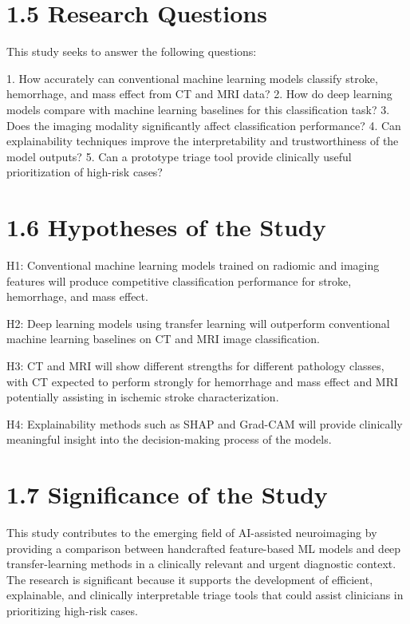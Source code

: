 \documentclass[12pt,a4paper]{report}
\begin{document}
\section{1.5 Research Questions}

This study seeks to answer the following questions:

1. How accurately can conventional machine learning models classify stroke, hemorrhage, and mass effect from CT and MRI data?
2. How do deep learning models compare with machine learning baselines for this classification task?
3. Does the imaging modality significantly affect classification performance?
4. Can explainability techniques improve the interpretability and trustworthiness of the model outputs?
5. Can a prototype triage tool provide clinically useful prioritization of high-risk cases?

\section{1.6 Hypotheses of the Study}

H1: Conventional machine learning models trained on radiomic and imaging features will produce competitive classification performance for stroke, hemorrhage, and mass effect.

H2: Deep learning models using transfer learning will outperform conventional machine learning baselines on CT and MRI image classification.

H3: CT and MRI will show different strengths for different pathology classes, with CT expected to perform strongly for hemorrhage and mass effect and MRI potentially assisting in ischemic stroke characterization.

H4: Explainability methods such as SHAP and Grad-CAM will provide clinically meaningful insight into the decision-making process of the models.

\section{1.7 Significance of the Study}

This study contributes to the emerging field of AI-assisted neuroimaging by providing a comparison between handcrafted feature-based ML models and deep transfer-learning methods in a clinically relevant and urgent diagnostic context. The research is significant because it supports the development of efficient, explainable, and clinically interpretable triage tools that could assist clinicians in prioritizing high-risk cases.
\end{document}
